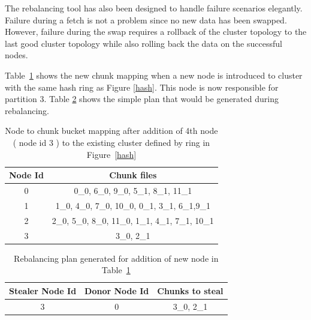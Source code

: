 The rebalancing tool has also been designed to handle failure
scenarios elegantly. Failure during a fetch is not a problem since no
new data has been swapped. However, failure during the swap requires a
rollback of the cluster topology to the last good cluster topology
while also rolling back the data on the successful nodes. 

Table~\ref{tab:new_node_to_chunk} shows the new chunk mapping when a
new node is introduced to cluster with the same hash ring as Figure
\ref{hash}. This node is now responsible for partition 3. Table 
\ref{tab:rebalance_plan} shows the simple plan that would be generated
during rebalancing.
 
\begin{table}
\begin{center}
    \begin{tabular}{ | c | c | }
    \hline
    Node Id & Chunk files \\ \hline
    0 &  	0\_0, 6\_0, 9\_0,      			5\_1, 8\_1, 11\_1 			\\
   	1 &   	1\_0, 4\_0, 7\_0, 10\_0,      	0\_1, 3\_1, 6\_1,9\_1  		\\
   	2 &    	2\_0, 5\_0, 8\_0, 11\_0,    	1\_1, 4\_1, 7\_1, 10\_1		\\
   	3 &   	3\_0,                         	2\_1 						\\
\hline
    \end{tabular}
\end{center}
 	\caption{Node to chunk bucket mapping after addition of 4th node ( node id 3 ) to the existing cluster defined by ring in Figure~\ref{hash}}
 	\label{tab:new_node_to_chunk}
\end{table}

\begin{table}
\begin{center}
    \begin{tabular}{ | c | c | c | }
    \hline
    Stealer Node Id & Donor Node Id & Chunks to steal \\ \hline
    3 &  0 & 3\_0, 2\_1	\\
\hline
    \end{tabular}
\end{center}
\caption{Rebalancing plan generated for addition of new node in Table~\ref{tab:new_node_to_chunk}}
\label{tab:rebalance_plan}
\end{table}

